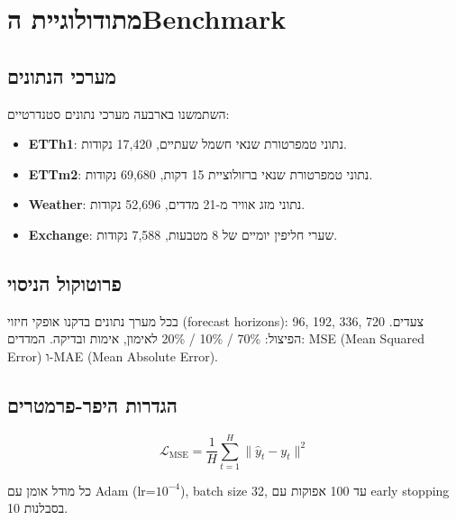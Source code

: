 
\chapter{מתודולוגיית ה\textenglish{Benchmark}}

\section{מערכי הנתונים}

השתמשנו בארבעה מערכי נתונים סטנדרטיים:
\begin{itemize}
\item \textbf{\textenglish{ETTh1}}: נתוני טמפרטורת שנאי חשמל שעתיים, \textenglish{17,420} נקודות.
\item \textbf{\textenglish{ETTm2}}: נתוני טמפרטורת שנאי ברזולוציית 15 דקות, \textenglish{69,680} נקודות.
\item \textbf{\textenglish{Weather}}: נתוני מזג אוויר מ-\textenglish{21} מדדים, \textenglish{52,696} נקודות.
\item \textbf{\textenglish{Exchange}}: שערי חליפין יומיים של \textenglish{8} מטבעות, \textenglish{7,588} נקודות.
\end{itemize}

\section{פרוטוקול הניסוי}

בכל מערך נתונים בדקנו אופקי חיזוי (\textenglish{forecast horizons}): \textenglish{96, 192, 336, 720} צעדים. הפיצול: \textenglish{70\% / 10\% / 20\%} לאימון, אימות ובדיקה. המדדים: \textenglish{MSE} (\textenglish{Mean Squared Error}) ו-\textenglish{MAE} (\textenglish{Mean Absolute Error}).

\section{הגדרות היפר-פרמטרים}

\begin{equation}
\mathcal{L}_{\text{MSE}} = \frac{1}{H} \sum_{t=1}^H \|\hat{y}_t - y_t\|^2
\end{equation}

כל מודל אומן עם \textenglish{Adam} (\textenglish{lr=$10^{-4}$}), \textenglish{batch size 32}, עד \textenglish{100} אפוקות עם \textenglish{early stopping} בסבלנות \textenglish{10}.

